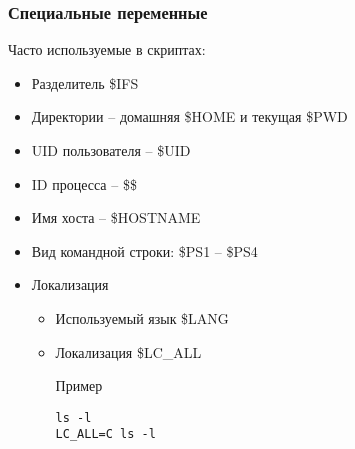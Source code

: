 \begin{frame}[fragile]
	\frametitle{Специальные переменные}

	Часто используемые в скриптах:

	\begin{itemize}
		\item Разделитель \$IFS
		\item Директории -- домашняя \$HOME и текущая \$PWD
		\item UID пользователя -- \$UID
		\item ID процесса -- \$\$
		\item Имя хоста -- \$HOSTNAME
		\item Вид командной строки: \$PS1 -- \$PS4
		\item Локализация
			\begin{itemize}
				\item Используемый язык \$LANG
				\item Локализация \$LC\_ALL
					\begin{block}{Пример}
						\begin{lstlisting}
ls -l 
LC_ALL=C ls -l
						\end{lstlisting}
					\end{block}
			\end{itemize}
	\end{itemize}

\end{frame}



